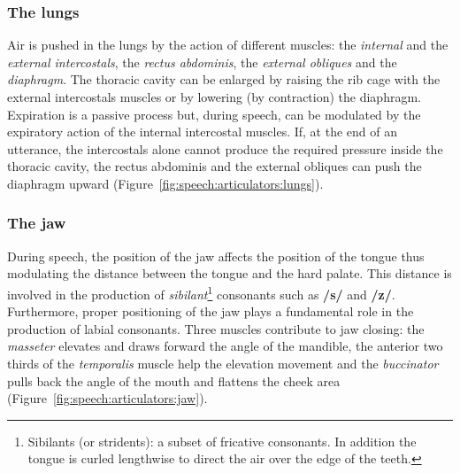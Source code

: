 \subsubsection{The lungs}
Air is pushed in the lungs by the action of different muscles: the
\emph{internal} and the \emph{external intercostals}, the \emph{rectus 
abdominis}, the \emph{external obliques} and the \emph{diaphragm}.
The thoracic cavity can be enlarged by raising the rib cage with the 
external intercostals muscles or by lowering (by contraction) the diaphragm. 
Expiration is a passive process but, during speech, can be modulated by the
expiratory action of the internal intercostal muscles.
If, at the end of an utterance, the intercostals alone cannot produce the
required pressure inside the thoracic cavity, the rectus abdominis and the 
external obliques can push the diaphragm upward 
(Figure~\ref{fig:speech:articulators:lungs}).

\subsubsection{The jaw}
During speech, the position of the jaw affects the position of the tongue thus
modulating the distance between the tongue and the hard palate.
This distance is involved in the production of
\emph{sibilant}\footnote{Sibilants (or stridents): a subset of fricative
consonants. In addition the tongue is curled lengthwise to direct the air over 
the edge of the teeth.}
consonants such as \textbf{/s/} and \textbf{/z/}.
Furthermore, proper positioning of the jaw plays a fundamental role
in the production of labial consonants.
Three muscles contribute to jaw closing: the \emph{masseter} elevates and draws
forward the angle of the mandible, the anterior two thirds of
the \emph{temporalis} muscle help the elevation movement and the
\emph{buccinator} pulls back the angle of the mouth and flattens the cheek area
(Figure~\ref{fig:speech:articulators:jaw}).


